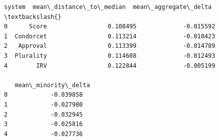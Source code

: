 \documentclass[11pt]{article}
\makeatletter
\newcommand{\boxspacing}{\kern\kvtcb@left@rule\kern\kvtcb@boxsep}
\newcommand{\prompt}[4]{
        {\ttfamily\llap{{\color{#2}[#3]:\hspace{3pt}#4}}\vspace{-\baselineskip}}
    }
\makeatother
\begin{document}
            \begin{tcolorbox}[breakable, size=fbox, boxrule=.5pt, pad at break*=1mm, opacityfill=0]
\prompt{Out}{outcolor}{104}{\boxspacing}
\begin{Verbatim}[commandchars=\\\{\}]
      system  mean\_distance\_to\_median  mean\_aggregate\_delta  \textbackslash{}
0      Score                 0.108495             -0.015592
1  Condorcet                 0.113214             -0.010423
2   Approval                 0.113399             -0.014789
3  Plurality                 0.114608             -0.012493
4        IRV                 0.122844             -0.005199

   mean\_minority\_delta
0            -0.039858
1            -0.027980
2            -0.032945
3            -0.025816
4            -0.027736
\end{Verbatim}
\end{tcolorbox}
        
\end{document}
